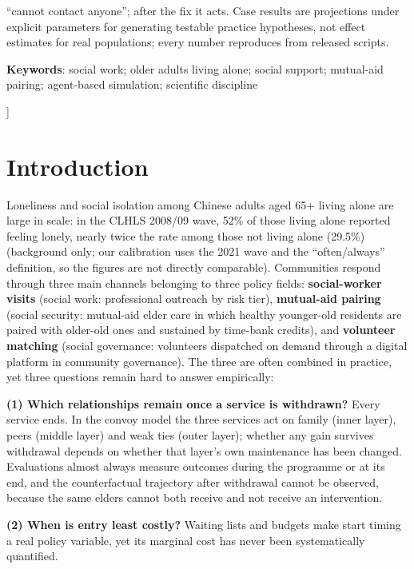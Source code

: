 \documentclass[10pt,twocolumn]{article}
\begin{document}
\begin{minipage}{\textwidth}
``cannot contact anyone''; after the fix it acts. Case results are projections under explicit parameters for generating testable practice hypotheses, not effect estimates for real populations; every number reproduces from released scripts.\par\vspace{0.4em}
\noindent\textbf{Keywords}: social work; older adults living alone; social support; mutual-aid pairing; agent-based simulation; scientific discipline
\end{minipage}
\vspace{1.2em}
]

\section{Introduction}
Loneliness and social isolation among Chinese adults aged 65+ living alone are large in scale: in the CLHLS 2008/09 wave, 52\% of those living alone reported feeling lonely, nearly twice the rate among those not living alone (29.5\%)\citep{wei2022living} (background only; our calibration uses the 2021 wave and the ``often/always'' definition, so the figures are not directly comparable). Communities respond through three main channels belonging to three policy fields: \textbf{social-worker visits} (social work: professional outreach by risk tier), \textbf{mutual-aid pairing} (social security: mutual-aid elder care in which healthy younger-old residents are paired with older-old ones and sustained by time-bank credits), and \textbf{volunteer matching} (social governance: volunteers dispatched on demand through a digital platform in community governance). The three are often combined in practice, yet three questions remain hard to answer empirically:

\textbf{(1) Which relationships remain once a service is withdrawn?} Every service ends. In the convoy model\citep{kahn1980convoys} the three services act on family (inner layer), peers (middle layer) and weak ties (outer layer); whether any gain survives withdrawal depends on whether that layer's own maintenance has been changed. Evaluations almost always measure outcomes during the programme or at its end\citep{lu2024timebank}, and the counterfactual trajectory after withdrawal cannot be observed, because the same elders cannot both receive and not receive an intervention.

\textbf{(2) When is entry least costly?} Waiting lists and budgets make start timing a real policy variable, yet its marginal cost has never been systematically quantified.
\end{document}
